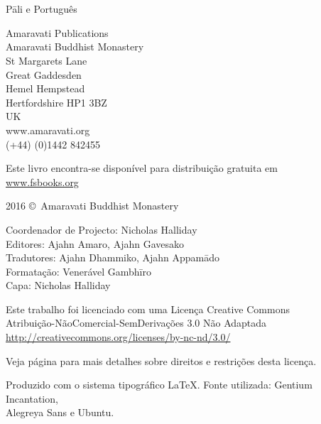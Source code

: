 
\thispagestyle{empty}

\enlargethispage{\baselineskip}

{\centering\small
\setlength{\parskip}{15pt}

{\normalsize
\thetitle\\
\thesubtitle\\
Pāli e Português}

Amaravati Publications\\
Amaravati Buddhist Monastery\\
St Margarets Lane\\
Great Gaddesden\\
Hemel Hempstead\\
Hertfordshire HP1 3BZ\\
UK\\
www.amaravati.org\\
(+44) (0)1442 842455

Este livro encontra-se disponível para distribuição gratuita em\\
\href{http://fsbooks.org/}{www.fsbooks.org}


2016 \copyright\ Amaravati Buddhist Monastery


Coordenador de Projecto: Nicholas Halliday\\
Editores: Ajahn Amaro, Ajahn Gavesako\\
Tradutores: Ajahn Dhammiko, Ajahn Appamādo\\
Formatação: Venerável Gambhīro\\
Capa: Nicholas Halliday

\vfill

Este trabalho foi licenciado com uma Licença Creative Commons\\
Atribuição-NãoComercial-SemDerivações 3.0 Não Adaptada\\
\href{http://creativecommons.org/licenses/by-nc-nd/3.0/}{http://creativecommons.org/licenses/by-nc-nd/3.0/}

Veja página \pageref{copyright-details} para mais detalhes sobre direitos e restrições desta licença.

Produzido com o sistema tipográfico \LaTeX. Fonte utilizada: Gentium Incantation,\\
Alegreya Sans e Ubuntu.

\theEditionInfo


}
